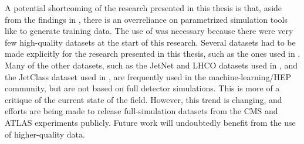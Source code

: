 A potential shortcoming of the research presented in this thesis is that, aside from the findings in , there is an overreliance on parametrized simulation tools like \delphes to generate training data.
The use of \delphes was necessary because there were very few high-quality datasets at the start of this research.
Several datasets had to be made explicitly for the research presented in this thesis, such as the ones used in .
Many of the other datasets, such as the JetNet and LHCO datasets used in , and the JetClass dataset used in , are frequently used in the machine-learning/HEP community, but are not based on full detector simulations.
This is more of a critique of the current state of the field.
However, this trend is changing, and efforts are being made to release full-simulation datasets from the CMS and ATLAS experiments publicly.
Future work will undoubtedly benefit from the use of higher-quality data.
